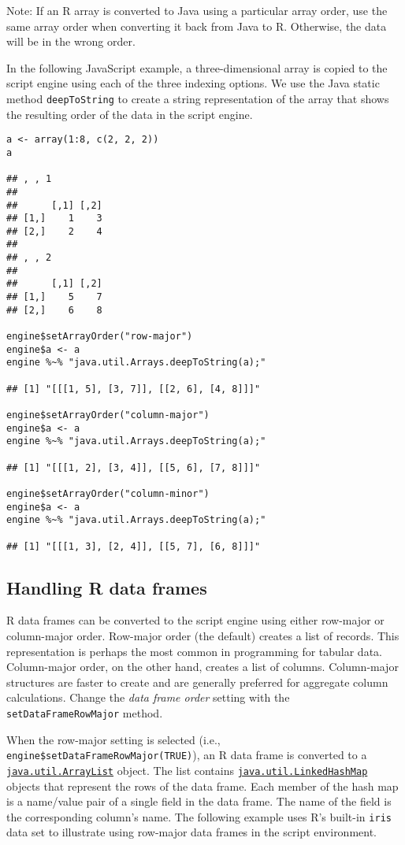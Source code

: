 \documentclass[
article,
11pt, %
a4paper, %
oneside, %
headinclude,footinclude, %
]{scrartcl}
\theoremstyle{definition} %
\theoremstyle{plain} %
\theoremstyle{remark} %
\newcommand{\code}[1]{\texttt{#1}}
\newcommand{\strong}[1]{\texorpdfstring{{\normalfont\fontseries{b}\selectfont #1}}{#1}}
\begin{document}
\strong{Note:} If an R array is converted to Java using a particular array order, use the same array order when converting it back from Java to R. Otherwise, the data will be in the wrong order.

In the following JavaScript example, a three-dimensional array is copied to the script engine using each of the three indexing options. We use the Java static method \code{deepToString} to create a string representation of the array that shows the resulting order of the data in the script engine.

\begin{verbatim}
a <- array(1:8, c(2, 2, 2))
a

## , , 1
##
##      [,1] [,2]
## [1,]    1    3
## [2,]    2    4
##
## , , 2
##
##      [,1] [,2]
## [1,]    5    7
## [2,]    6    8

engine$setArrayOrder("row-major")
engine$a <- a
engine %~% "java.util.Arrays.deepToString(a);"

## [1] "[[[1, 5], [3, 7]], [[2, 6], [4, 8]]]"

engine$setArrayOrder("column-major")
engine$a <- a
engine %~% "java.util.Arrays.deepToString(a);"

## [1] "[[[1, 2], [3, 4]], [[5, 6], [7, 8]]]"

engine$setArrayOrder("column-minor")
engine$a <- a
engine %~% "java.util.Arrays.deepToString(a);"

## [1] "[[[1, 3], [2, 4]], [[5, 7], [6, 8]]]"
\end{verbatim}

\hypertarget{handling-r-data-frames}{}
\subsection{Handling R data frames}

R data frames can be converted to the script engine using either row-major or column-major order. Row-major order (the default) creates a list of records. This representation is perhaps the most common in programming for tabular data. Column-major order, on the other hand, creates a list of columns. Column-major structures are faster to create and are generally preferred for aggregate column calculations. Change the \textit{data frame order} setting with the \code{setDataFrameRowMajor} method.

When the row-major setting is selected (i.e., \code{engine\$setDataFrameRowMajor(TRUE)}), an R data frame is converted to a \href{https://docs.oracle.com/javase/8/docs/api/java/util/ArrayList.html}{\code{java.util.ArrayList}} object. The list contains  \href{https://docs.oracle.com/javase/8/docs/api/java/util/LinkedHashMap.html}{\code{java.util.LinkedHashMap}} objects that represent the rows of the data frame. Each member of the hash map is a name/value pair of a single field in the data frame. The name of the field is the corresponding column's name. The following example uses R's built-in \code{iris} data set to illustrate using row-major data frames in the script environment.
\end{document}
